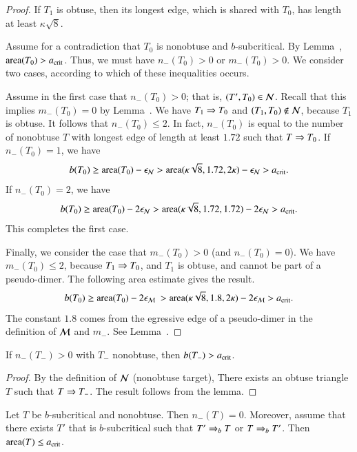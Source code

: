 \begin{proof} 
  If $T_1$ is obtuse, then its longest edge, which is shared with
  $T_0$, has length at least $\kappa\sqrt8$.

  Assume for a contradiction that $T_0$ is nonobtuse and
  $b$-subcritical.  By Lemma~, ${\operatorname{area}}(T_0) > a_\text{crit}$.
  Thus, we must have $n_-(T_0)>0$ or $m_-(T_0)>0$.  We consider two
  cases, according to which of these inequalities occurs.

  Assume in the first case that $n_-(T_0)>0$; that is, $(T',T_0)\in
  \mathcal N$.  Recall that this implies $m_-(T_0)=0$ by
  Lemma~.  We have $T_1\Rightarrow T_0$ and $(T_1,T_0)\not\in
  \mathcal N$, because $T_1$ is obtuse.  It follows that $n_-(T_0)\le 2$.  In
  fact, $n_-(T_0)$ is equal to the number of nonobtuse $T$ with
  longest edge of length at least $1.72$ such that $T\Rightarrow T_0$.  If
  $n_-(T_0)=1$, we have
  \[
b(T_0) \ge {\operatorname{area}}(T_0) - \epsilon_{\mathcal N} 
> {\operatorname{area}}(\kappa\sqrt8,1.72,2\kappa)  - \epsilon_{\mathcal N} > a_\text{crit}.
\]
If $n_-(T_0)=2$, we have
  \[
b(T_0) \ge {\operatorname{area}}(T_0) - 2\epsilon_{\mathcal N} 
> {\operatorname{area}}(\kappa\sqrt8,1.72,1.72)  - 2\epsilon_{\mathcal N} > a_\text{crit}.
\]
  This completes the first case.

  Finally, we consider the case that $m_-(T_0)>0$ (and $n_-(T_0)=0$).
  We have $m_-(T_0)\le 2$, because $T_1\Rightarrow T_0$, and $T_1$ is obtuse,
  and cannot be part of a pseudo-dimer.  The following area estimate
  gives the result.
\[
  b(T_0) \ge \area(T_0) - 2\epsM\ 
  > \area(\kappa\sqrt8,1.8,2\kappa) -
  2\epsM > \acrit.
\]
The constant $1.8$ comes from the egressive edge of a pseudo-dimer in
the definition of $\mathcal M$ and $m_-$.  See Lemma~\rif{calc:pseudo2}.
\end{proof}

\begin{corollary} 
  If $n_-(T_-)>0$ with $T_-$ nonobtuse, then $b(T_-) > a_\text{crit}$.
\end{corollary}  

\begin{proof}  
  By the definition of $\mathcal N$ (nonobtuse target), There exists an obtuse
  triangle $T$ such that $T\Rightarrow T_-$.  The result follows from the
  lemma.
\end{proof}

\begin{lemma}  
  Let $T$ be $b$-subcritical and nonobtuse.  Then $n_-(T)=0$.
  Moreover, assume that there exists $T'$ that is $b$-subcritical such
  that $T'\Rightarrow_{b} T$ or $T\Rightarrow_{b} T'$.  Then ${\operatorname{area}}(T)\le a_\text{crit}$.
\end{lemma}

